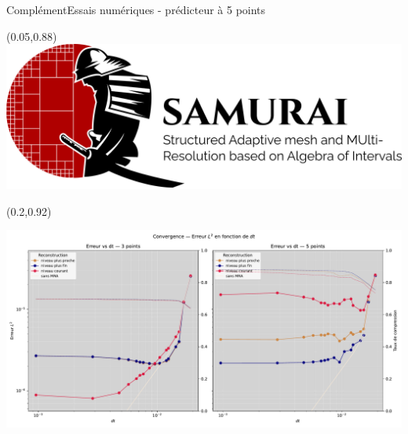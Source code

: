 \begin{frame}{Complément}{Essais numériques - prédicteur à 5 points}
    \begin{textblock*}{40pt}(0.05\paperwidth,0.88\paperheight)\includegraphics[scale=.03]{medias/2_/1_/light_logo.png}
    \end{textblock*}
    \begin{textblock*}{40pt}(0.2\paperwidth,0.92\paperheight)
        {\color{black}{+ Ponio}}
    \end{textblock*}
    \includegraphics[width = \textwidth]{medias/3_/error_vs_dt_by_mlf.pdf}
\end{frame}